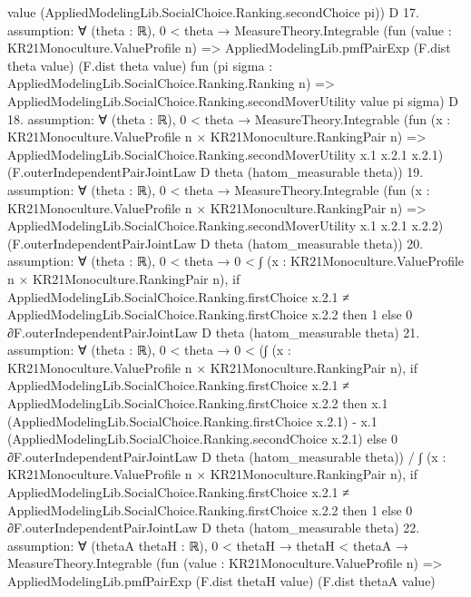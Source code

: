 \documentclass[10pt]{article}
\begin{document}
\begin{ReviewVerbatim}
          value (AppliedModelingLib.SocialChoice.Ranking.secondChoice pi))
      D
17. assumption: ∀ (theta : ℝ),
  0 < theta →
    MeasureTheory.Integrable
      (fun (value : KR21Monoculture.ValueProfile n) =>
        AppliedModelingLib.pmfPairExp (F.dist theta value) (F.dist theta value)
          fun (pi sigma : AppliedModelingLib.SocialChoice.Ranking.Ranking n) =>
          AppliedModelingLib.SocialChoice.Ranking.secondMoverUtility value pi sigma)
      D
18. assumption: ∀ (theta : ℝ),
  0 < theta →
    MeasureTheory.Integrable
      (fun (x : KR21Monoculture.ValueProfile n × KR21Monoculture.RankingPair n) =>
        AppliedModelingLib.SocialChoice.Ranking.secondMoverUtility x.1 x.2.1 x.2.1)
      (F.outerIndependentPairJointLaw D theta (hatom_measurable theta))
19. assumption: ∀ (theta : ℝ),
  0 < theta →
    MeasureTheory.Integrable
      (fun (x : KR21Monoculture.ValueProfile n × KR21Monoculture.RankingPair n) =>
        AppliedModelingLib.SocialChoice.Ranking.secondMoverUtility x.1 x.2.1 x.2.2)
      (F.outerIndependentPairJointLaw D theta (hatom_measurable theta))
20. assumption: ∀ (theta : ℝ),
  0 < theta →
    0 <
      ∫ (x : KR21Monoculture.ValueProfile n × KR21Monoculture.RankingPair n),
        if
            AppliedModelingLib.SocialChoice.Ranking.firstChoice x.2.1 ≠
              AppliedModelingLib.SocialChoice.Ranking.firstChoice x.2.2 then
          1
        else 0 ∂F.outerIndependentPairJointLaw D theta (hatom_measurable theta)
21. assumption: ∀ (theta : ℝ),
  0 < theta →
    0 <
      (∫ (x : KR21Monoculture.ValueProfile n × KR21Monoculture.RankingPair n),
          if
              AppliedModelingLib.SocialChoice.Ranking.firstChoice x.2.1 ≠
                AppliedModelingLib.SocialChoice.Ranking.firstChoice x.2.2 then
            x.1 (AppliedModelingLib.SocialChoice.Ranking.firstChoice x.2.1) -
              x.1 (AppliedModelingLib.SocialChoice.Ranking.secondChoice x.2.1)
          else 0 ∂F.outerIndependentPairJointLaw D theta (hatom_measurable theta)) /
        ∫ (x : KR21Monoculture.ValueProfile n × KR21Monoculture.RankingPair n),
          if
              AppliedModelingLib.SocialChoice.Ranking.firstChoice x.2.1 ≠
                AppliedModelingLib.SocialChoice.Ranking.firstChoice x.2.2 then
            1
          else 0 ∂F.outerIndependentPairJointLaw D theta (hatom_measurable theta)
22. assumption: ∀ (thetaA thetaH : ℝ),
  0 < thetaH →
    thetaH < thetaA →
      MeasureTheory.Integrable
        (fun (value : KR21Monoculture.ValueProfile n) =>
          AppliedModelingLib.pmfPairExp (F.dist thetaH value) (F.dist thetaA value)

\end{ReviewVerbatim}
\end{document}
